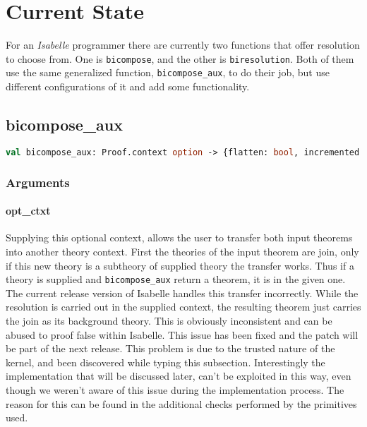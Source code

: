\chapter{Current State}\label{chapter:current}

For an \textit{Isabelle} programmer there are currently two functions that offer resolution to choose from. One is \texttt{bicompose}, and the other is \texttt{biresolution}. Both of them use the same generalized function, \texttt{bicompose\_aux}, to do their job, but use different configurations of it and add some functionality.

\section{bicompose\_aux}

\begin{lstlisting}[language=ML,breaklines=true]
val bicompose_aux: Proof.context option -> {flatten: bool, incremented: bool, match: bool} -> thm * ((term * term) list * term list * term * term) * bool -> bool * thm * int -> thm Seq.seq
\end{lstlisting}

\subsection{Arguments}

\subsubsection{opt\_ctxt}
Supplying this optional context, allows the user to transfer both input theorems into another theory context. First the theories of the input theorem are join, only if this new theory is a subtheory of supplied theory the transfer works. Thus if a theory is supplied and \texttt{bicompose\_aux} return a theorem, it is in the given one.\\
The current release version of Isabelle handles this transfer incorrectly. While the resolution is carried out in the supplied context, the resulting theorem just carries the join as its background theory. This is obviously inconsistent and can be abused to proof false within Isabelle. This issue has been fixed and the patch will be part of the next release.\newline
This problem is due to the trusted nature of the kernel, and been discovered while typing this subsection. Interestingly the implementation that will be discussed later, can't be exploited in this way, even though we weren't aware of this issue during the implementation process. The reason for this can be found in the additional checks performed by the primitives used.\newline

